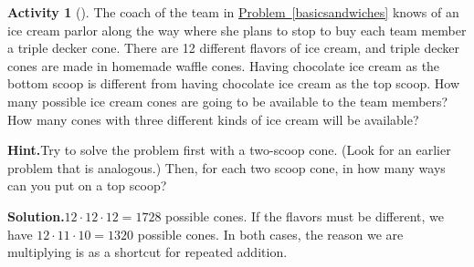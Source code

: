 \documentclass[10pt,]{book}
\theoremstyle{plain}
\theoremstyle{definition}
\newtheorem{activity}[project]{Activity}
\numberwithin{equation}{chapter}
\begin{document}
\begin{activity}[]\label{tripledeckercone}
The coach of the team in \hyperref[basicsandwiches]{Problem~\ref{basicsandwiches}} knows of an ice cream parlor along the way where she plans to stop to buy each team member a triple decker cone. There are 12 different flavors of ice cream, and triple decker cones are made in homemade waffle cones. Having chocolate ice cream as the bottom scoop is different from having chocolate ice cream as the top scoop. How many possible ice cream cones are going to be available to the team members? How many cones with three different kinds of ice cream will be available?%
\par\medskip\noindent%
\textbf{Hint.}\quad Try to solve the problem first with a two-scoop cone. (Look for an earlier problem that is analogous.) Then, for each two scoop cone, in how many ways can you put on a top scoop?%
\par\medskip\noindent%
\textbf{Solution.}\quad \(12\cdot12\cdot12 =1728\) possible cones. If the flavors must be different, we have \(12\cdot11\cdot 10 = 1320\) possible cones. In both cases, the reason we are multiplying is as a shortcut for repeated addition.%
\end{activity}
\end{document}
